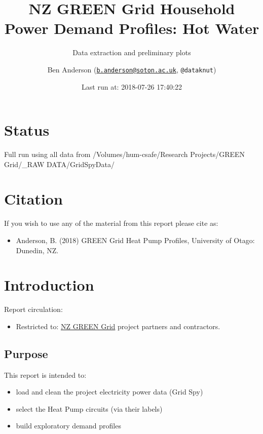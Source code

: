 \documentclass[]{article}
\title{NZ GREEN Grid Household Power Demand Profiles: Hot Water}
\subtitle{Data extraction and preliminary plots}
\author{Ben Anderson
(\href{mailto:b.anderson@soton.ac.uk}{\nolinkurl{b.anderson@soton.ac.uk}},
\texttt{@dataknut})}
\date{Last run at: 2018-07-26 17:40:22}
\providecommand{\tightlist}{%
  \setlength{\itemsep}{0pt}\setlength{\parskip}{0pt}}
\begin{document}
\maketitle

{
\setcounter{tocdepth}{2}
\tableofcontents
}
\newpage

\section{Status}\label{status}

Full run using all data from /Volumes/hum-csafe/Research Projects/GREEN
Grid/\_RAW DATA/GridSpyData/

\section{Citation}\label{citation}

If you wish to use any of the material from this report please cite as:

\begin{itemize}
\tightlist
\item
  Anderson, B. (2018) GREEN Grid Heat Pump Profiles, University of
  Otago: Dunedin, NZ.
\end{itemize}

\newpage

\section{Introduction}\label{introduction}

Report circulation:

\begin{itemize}
\tightlist
\item
  Restricted to:
  \href{https://www.otago.ac.nz/centre-sustainability/research/energy/otago050285.html}{NZ
  GREEN Grid} project partners and contractors.
\end{itemize}

\subsection{Purpose}\label{purpose}

This report is intended to:

\begin{itemize}
\tightlist
\item
  load and clean the project electricity power data (Grid Spy)
\item
  select the Heat Pump circuits (via their labels)
\item
  build exploratory demand profiles
\end{itemize}
\end{document}
